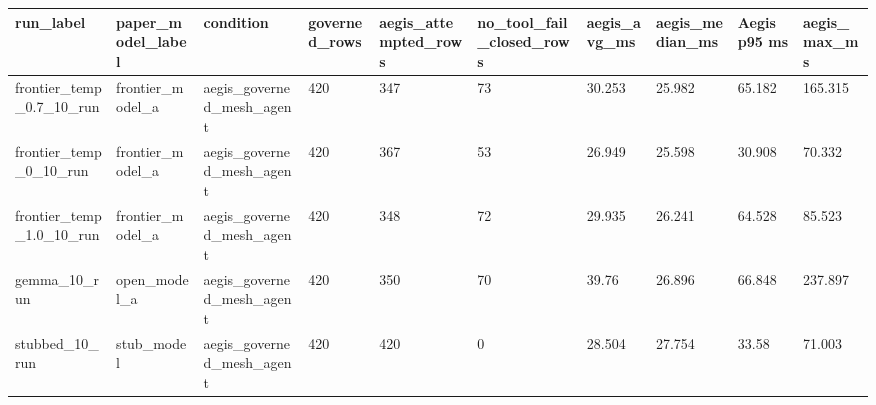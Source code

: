 \begin{tabular}{llllllllll}
 \hline
run\_label & paper\_model\_label & condition & governed\_rows & aegis\_attempted\_rows & no\_tool\_fail\_closed\_rows & aegis\_avg\_ms & aegis\_median\_ms & Aegis p95 ms & aegis\_max\_ms \\
 \hline
frontier\_temp\_0.7\_10\_run & frontier\_model\_a & aegis\_governed\_mesh\_agent & 420 & 347 & 73 & 30.253 & 25.982 & 65.182 & 165.315 \\
frontier\_temp\_0\_10\_run & frontier\_model\_a & aegis\_governed\_mesh\_agent & 420 & 367 & 53 & 26.949 & 25.598 & 30.908 & 70.332 \\
frontier\_temp\_1.0\_10\_run & frontier\_model\_a & aegis\_governed\_mesh\_agent & 420 & 348 & 72 & 29.935 & 26.241 & 64.528 & 85.523 \\
gemma\_10\_run & open\_model\_a & aegis\_governed\_mesh\_agent & 420 & 350 & 70 & 39.76 & 26.896 & 66.848 & 237.897 \\
stubbed\_10\_run & stub\_model & aegis\_governed\_mesh\_agent & 420 & 420 & 0 & 28.504 & 27.754 & 33.58 & 71.003 \\
 \hline
\end{tabular}
